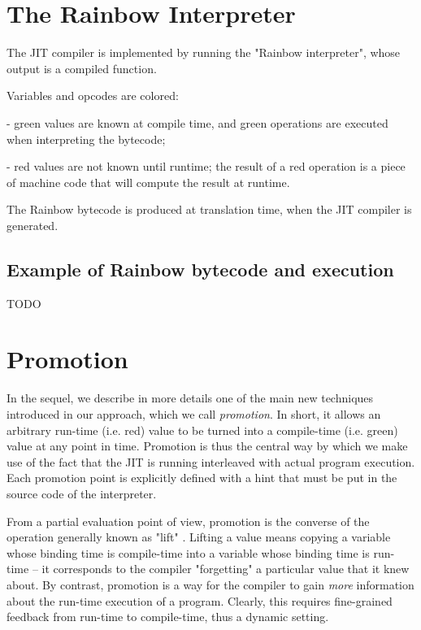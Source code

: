\section{The Rainbow Interpreter}

The JIT compiler is implemented by running the "Rainbow interpreter", whose
output is a compiled function.

Variables and opcodes are colored:

  - green values are known at compile time, and green operations are executed
    when interpreting the bytecode;

  - red values are not known until runtime; the result of a red operation is a
    piece of machine code that will compute the result at runtime.

The Rainbow bytecode is produced at translation time, when the JIT compiler is
generated.


\subsection{Example of Rainbow bytecode and execution}

TODO

\section{Promotion}
\label{sec:promotion}

In the sequel, we describe in more details one of the main new
techniques introduced in our approach, which we call \emph{promotion}.  In
short, it allows an arbitrary run-time (i.e. red) value to be turned into a
compile-time (i.e. green) value at any point in time.  Promotion is thus the central way by
which we make use of the fact that the JIT is running interleaved with actual
program execution. Each promotion point is explicitly defined with a hint that
must be put in the source code of the interpreter.

From a partial evaluation point of view, promotion is the converse of
the operation generally known as "lift" \cite{XXX}.  Lifting a value means
copying a variable whose binding time is compile-time into a variable
whose binding time is run-time – it corresponds to the compiler
"forgetting" a particular value that it knew about.  By contrast,
promotion is a way for the compiler to gain \emph{more} information about
the run-time execution of a program. Clearly, this requires
fine-grained feedback from run-time to compile-time, thus a
dynamic setting.

